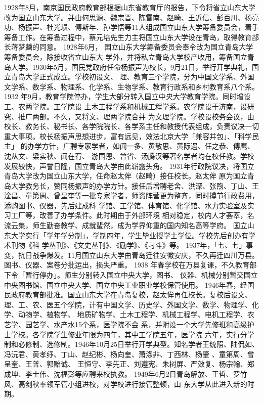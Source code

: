 \documentclass[openany]{sduthesis} %
\begin{document}
1928年8月，南京国民政府教育部根据山东省教育厅的报告，下令将省立山东大学改为国立山东大学。并由何思源、魏宗晋、陈雪南、赵畸、王近信、彭百川、杨亮功、杨振声、杜光埙、傅斯年、孙学悟等11人组成国立山东大学筹备委员会，着手筹备工作。在筹备过程中，蔡元培先生力主将国立山东大学设在青岛，取得教育部长蒋梦麟的同意。 1928年6月， 国立山东大学筹备委员会奉令改为国立青岛大学筹备委员会，除接收省立山东大 学外，并将私立青岛大学校产收用，筹备国立青岛大学。1930年5月，国民党政府任命杨振声为校长，9月21日，举行开学典礼，国立青岛大学正式成立。学校初设文、 理、教育三个学院，分为中国文学系、外国文学系、数学系、物理系、化学系、生物学系、教育行政系和乡村教育系八个系。1932 年9月，教育学院停办，学生大部分转入国立中央大学教育学院。同时增设工、农两学院。工学院设 土木工程学系和机械工程学系。农学院设于济南，设研究、推广两部。不久，又将文、理两学院合并 为文理学院。学校设校务会议，由校长、教务长、秘书长、各学院院长、各学系主任和教授代表组成，负责议决一切重大事项。校长杨振声思想进步，富有远见，效法北京大学「兼容并包」、「科学民主」 的办学方针，广聘专家学者，如闻一多、黄敬思、黄际遇、任之恭、傅鹰、沈从文、梁实秋、闻在宥、 游国恩、曾省、汤腾汉等著名学者均在校任教。学校发展较快，声誉日隆，国立青岛大学由此崭露头角。 1931年行政院议决，将国立青岛大学改为国立山东大学，任命赵太侔（赵畸）接任校长。赵太侔 原为国立青岛大学教务长，赞同杨振声的办学方针。接任后增聘老舍、洪深、张煦、丁山、王淦昌、童第周、曾呈奎等一批专家学者，师资阵营更为整齐，同时撙节行政费用，添购图书、仪器，先后建成科 学馆、工学馆、体育馆、化学馆、水力实验室及实习工厂等，改善了办学条件。此时期由于外部环境 相对稳定，校内人才荟萃，名流云集，师生勤奋教学、成就蜚然，成为学界仰重的国内知名高等学府。 国立山东大学实行「学年学分制」，学制四年，学生毕业授学士学位。学校先后创办有学术刊物《科 学丛刊》、《文史丛刊》、《励学》、《刁斗》等。 1937年，「七、七」事变，抗日战争爆发。11月国立山东大学由青岛迁往安徽安庆，不久再迁四川万县。图书、仪器、案卷分批运出，损失严重。 1938 年春学校在万县复课，不久教育部下令「暂行停办」。师生分别转入国立中央大学，图书、 仪器、机械分别暂交国立中央图书馆、国立中央大学、国立中央工业职业学校保管使用。 1946年春，经国民政府教育部批准。国立山东大学在青岛复校，赵太侔再任校长。复校后设文、 理、工、农、医五个学院，计有中国文学、历史学、外国文学、数学、物理学、化学、动物学、植物学、 地质矿物学、土木工程学、机械工程学、电机工程学、农艺学、园艺学、水产水15个系，医学院不会 系，并附设一个大学先修班和高级护士学校。各学院学生修业年限为四年，其中工学院五年，医学院 六年，实行分学制和必修制、选修制。1946年10月25日举行开学典型。知名学者王统照、陆侃如、 冯沅君、黄孝纾、丁山、赵纪彬、杨向奎、萧涤非、丁西林、杨肇 、童第周、曾呈奎、王普、郭贻诚、 王恒守、李先正、刘遵宪、朱树屏、严效复、杨宗翰、郑成坤、李士伟、沈福彭等应聘来校执教。 1949年6月2日青岛解放、王哲、罗竹风、高剑秋率领军管小组进校，对学校进行接管整顿，山 东大学从此进入新的时期。
\end{document}
